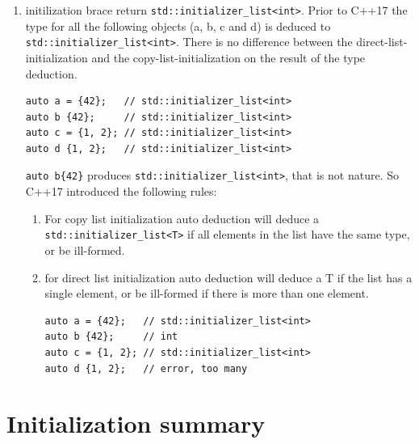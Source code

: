 \documentclass[a4paper,11pt,twoside]{book}
\begin{document}
\begin{enumerate}
		\item initilization brace return \texttt{std::initializer\_list<int>}. Prior to C++17 the type for all the following objects (a, b, c and d) is deduced to \texttt{std::initializer\_list<int>}. There is no difference between the direct-list-initialization and the copy-list-initialization on the result of the type deduction. 
		
\begin{lstlisting}[numbers=none]
auto a = {42};   // std::initializer_list<int>
auto b {42};     // std::initializer_list<int>
auto c = {1, 2}; // std::initializer_list<int>
auto d {1, 2};   // std::initializer_list<int>
\end{lstlisting}
		\texttt{auto b\{42\}} produces \texttt{std::initializer\_list<int>}, that is not nature. So C++17 introduced the following rules: 

    \begin{enumerate}
		
		\item  For copy list initialization auto deduction will deduce a \texttt{std::initializer\_list<T>} if all elements in the list have the same type, or be ill-formed.
		
		\item for direct list initialization auto deduction will deduce a T if the list has a single element, or be ill-formed if there is more than one element.
\begin{lstlisting}[numbers=none]
auto a = {42};   // std::initializer_list<int>
auto b {42};     // int
auto c = {1, 2}; // std::initializer_list<int>
auto d {1, 2};   // error, too many 
\end{lstlisting}

	\end{enumerate}
\end{enumerate}


\section{Initialization summary}
\end{document}

